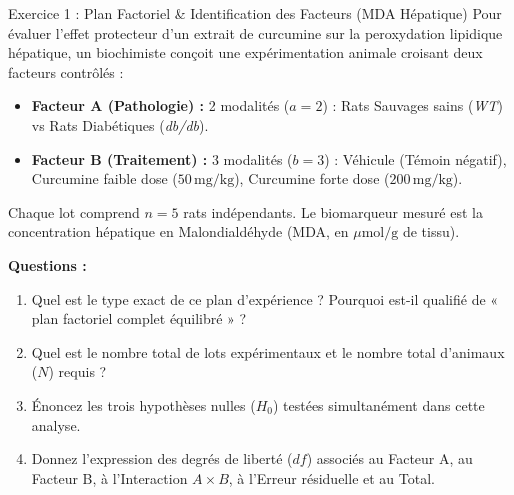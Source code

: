 \documentclass[11pt,a4paper]{article}
\begin{document}

\begin{exercicebox}{Exercice 1 : Plan Factoriel \& Identification des Facteurs (MDA Hépatique)}
Pour évaluer l'effet protecteur d'un extrait de curcumine sur la peroxydation lipidique hépatique, un biochimiste conçoit une expérimentation animale croisant deux facteurs contrôlés :
\begin{itemize}
  \item \textbf{Facteur A (Pathologie) :} 2 modalités ($a = 2$) : Rats Sauvages sains (\textit{WT}) vs Rats Diabétiques (\textit{db/db}).
  \item \textbf{Facteur B (Traitement) :} 3 modalités ($b = 3$) : Véhicule (Témoin négatif), Curcumine faible dose ($50\,\text{mg/kg}$), Curcumine forte dose ($200\,\text{mg/kg}$).
\end{itemize}
Chaque lot comprend $n = 5$ rats indépendants. Le biomarqueur mesuré est la concentration hépatique en Malondialdéhyde (MDA, en $\mu\text{mol/g}$ de tissu).

\textbf{Questions :}
\begin{enumerate}[label=\textbf{\alph*.}]
  \item Quel est le type exact de ce plan d'expérience ? Pourquoi est-il qualifié de « plan factoriel complet équilibré » ?
  \item Quel est le nombre total de lots expérimentaux et le nombre total d'animaux ($N$) requis ?
  \item Énoncez les trois hypothèses nulles ($H_0$) testées simultanément dans cette analyse.
  \item Donnez l'expression des degrés de liberté ($df$) associés au Facteur A, au Facteur B, à l'Interaction $A \times B$, à l'Erreur résiduelle et au Total.
\end{enumerate}
\end{exercicebox}
\end{document}
